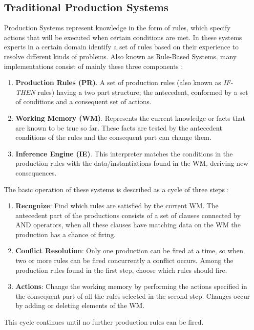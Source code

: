 \subsection{Traditional Production Systems}
Production Systems represent knowledge in the form of rules, which 
specify actions that will be executed when certain conditions are met. 
In these systems experts in a certain domain identify a set of rules 
based on their experience to  resolve different kinds of problems. 
Also known as Rule-Based Systems, many implementations consist 
of mainly these three components  
\cite{brachman1992knowledge}  \cite{konar2006computational}:
\begin{enumerate}   
\item \textbf{Production Rules (PR)}. A set of
production rules (also known as \textit{IF-THEN} rules) having a two part
structure; the antecedent, conformed by a set of conditions and a
consequent set of actions. 
\item \textbf{Working Memory (WM)}.
Represents the current knowledge or facts that are known to be true so
far. These facts are tested by the antecedent conditions of the rules
and the consequent part can change them. 
\item \textbf{Inference Engine (IE)}. 
This interpreter matches the conditions in the
production rules with the data/instantiations found in the WM,
deriving new consequences.
\end{enumerate}
The basic operation of these systems is described as a cycle of 
three steps  \cite{brachman1992knowledge}:
\begin{enumerate}
\item \textbf{Recognize}: Find which rules are satisfied by 
the current WM. The antecedent part of the productions consists 
of a set of clauses connected by AND operators, when all these 
clauses have matching data on the WM the production has a chance 
of firing.
\item \textbf{Conflict Resolution}: Only one production can be 
fired at a time, so when two or more rules can be fired concurrently 
a conflict occurs. Among the production rules found in the first 
step, choose which rules should fire.
\item \textbf{Actions}: Change the working memory by performing 
the actions specified in the consequent part of all the rules 
selected in the second step. Changes occur by adding or 
deleting elements of the WM.
\end{enumerate}
This cycle continues until no further production rules can be fired.
